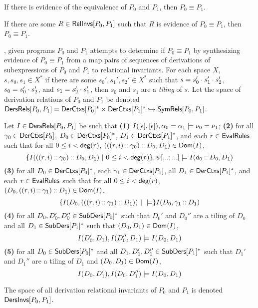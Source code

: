 If there is evidence of the equivalence of $P_0$ and $P_1$, then $P_0
\equiv P_1$.
%
\begin{lemma}
  \label{lemma:equiv-evidence}
  If there are some $R \in \mathsf{RelInvs}[ P_0, P_1 ]$ such that $R$ is
  evidence of $P_0 \equiv P_1$, then $P_0 \equiv P_1$.
\end{lemma}

\sys, given programs $P_0$ and $P_1$ attempts to determine if $P_0
\equiv P_1$ by synthesizing evidence of $P_0 \equiv P_1$ from a map
pairs of sequences of derivations of subexpressions of $P_0$ and $P_1$
to relational invariants.
For each space $X$, $s, s_0, s_1 \in X^{*}$ if there are some $s_0',
s_1', s_2' \in X^{*}$ such that $s = s_0' \cdot s_1' \cdot s_2'$,
$s_0 = s_0' \cdot s_2'$, and $s_1 = s_2' \cdot s_1'$, then $s_0$
and $s_1$ are a \emph{tiling} of $s$.
%
Let the space of derivation relations of $P_0$ and $P_1$ be denoted
$\mathsf{DersRels}[ P_0, P_1 ] = \mathsf{DerCtxs}[ P_0 ]^{*} \times
\mathsf{DerCtxs}[ P_1 ]^{*} \hookrightarrow \mathsf{SymRels}[ P_0, P_1 ]$.
%
\begin{defn}
  \label{defn:der-structs}
  Let $I \in \mathsf{DersRels}[ P_0, P_1 ] $ be such that
  \textbf{(1)} $I([ \epsilon ], [ \epsilon ]), \alpha_0 = \alpha_1
  \models \nu_0 = \nu_1$;
  \textbf{(2)} for all $\gamma_0 \in \mathsf{DerCtxs}[ P_0 ]$, %
  $D_0 \in \mathsf{DerCtxs}[ P_0 ]^{*}$, %
  $D_1 \in \mathsf{DerCtxs}[ P_1 ]^{*}$, and %
  each $r \in \mathsf{EvalRules}$ such that for all $0 \leq i < \mathsf{deg}(r)$,
  $(((r, i) \mathbin{::} \gamma_0) \mathbin{::} D_0, D_1) \in \mathsf{Dom}(I)$, 
  \[ \setformer{ I(((r, i) \cons \gamma_0) \cons D_0, D_1) }{ %
    0 \leq i < \degreeof(r) }, \symstep{ ... }{ ... } \entails %
  I( d_0 \cons D_0, D_1)
  \]
  \textbf{(3)} for all $D_0 \in \mathsf{DerCtxs}[ P_0 ]^{*}$, %
  each $\gamma_1 \in \mathsf{DerCtxs}[ P_1 ]$, %
  all $D_1 \in \mathsf{DerCtxs}[ P_1 ]^{*}$, and %
  each $r \in \mathsf{EvalRules}$ such that for all $0 \leq i < \mathsf{deg}(r)$,
  $(D_0, ((r, i) \mathbin{::} \gamma_1) \mathbin{::} D_1) \in \mathsf{Dom}(I)$, 
  \[ \setformer{ I( D_0, ( ( (r, i) \cons \gamma_1 ) \cons D_1) )}
  \entails %
  I( D_0, \gamma_1 \cons D_1 )
  \]
  \textbf{(4)} for all $D_0, D_0', D_0'' \in \mathsf{SubDers}[ P_0 ]^{*}$ such
  that $D_0'$ and $D_0''$ are a tiling of $D_0$ and all $D_1 \in
  \mathsf{SubDers}[ P_1 ]^{*}$ such that $(D_0, D_1) \in \mathsf{Dom}(I)$,
  \[ I(D_0', D_1), I(D_0'', D_1) \models I(D_0, D_1) \]
  \textbf{(5)} for all $D_0 \in \mathsf{SubDers}[ P_0 ]^{*}$ and all $D_1, D_1',
  D_1'' \in \mathsf{SubDers}[ P_1 ]^{*}$ such that $D_1'$ and $D_1''$ are a
  tiling of $D_1$ and $(D_0, D_1) \in \mathsf{Dom}(I)$,
  \[ I(D_0, D_1'), I(D_0, D_1'') \models I(D_0, D_1) \]
\end{defn}
%
The space of all derivation relational invariants of $P_0$ and $P_1$
is denoted $\mathsf{DersInvs}[ P_0, P_1 ]$.
%
%

